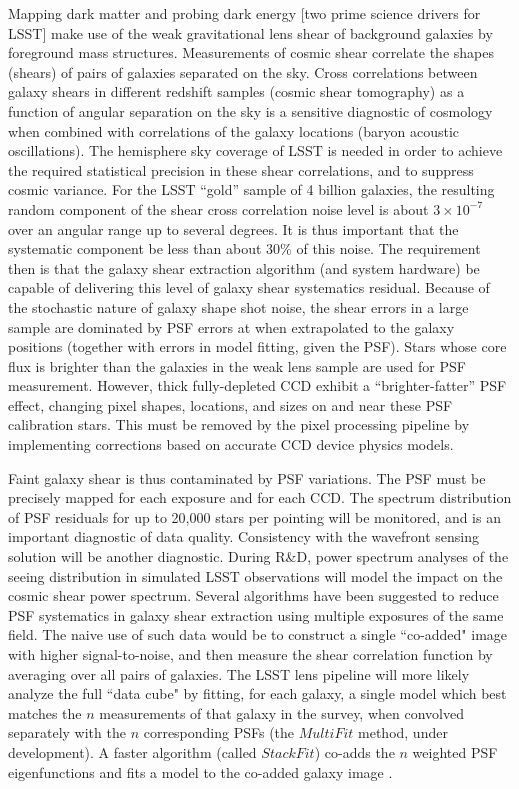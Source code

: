 \documentclass[SE,toc,lsstdraft]{lsstdoc}
\newcommand{\oldtext}[1]{{\color{red} #1}}
\newcommand{\newtext}[1]{{\color{blue} #1}}
\begin{document}
Mapping dark matter and probing dark energy [two prime science drivers for LSST] make use of the weak gravitational lens shear of background galaxies by foreground mass structures. Measurements of cosmic shear correlate the shapes (shears) of pairs of galaxies separated on the sky.  Cross correlations between galaxy shears in different redshift samples (cosmic shear tomography) \newtext{as a function of angular separation on the sky} is a sensitive diagnostic of cosmology when combined with correlations of the galaxy locations (baryon acoustic oscillations). The hemisphere sky coverage of LSST is needed in order to achieve the required statistical precision in these shear correlations, and to suppress cosmic variance.  For the LSST ``gold'' sample of 4 billion galaxies, the resulting random component of the shear cross correlation noise level is about $3\times10^{-7}$ over an angular range up to several degrees.  It is thus important that the systematic component be less than about 30\% of this noise.  The requirement then is that the galaxy shear extraction algorithm (and system hardware) be capable of delivering this level of galaxy shear systematics residual.  Because of the stochastic nature of galaxy shape shot noise, the shear errors in a large sample are dominated by PSF errors \oldtext{at} \newtext{when extrapolated to} the galaxy positions (together with errors in model fitting, given the PSF).
\newtext{
Stars whose core flux is brighter than the galaxies in the weak lens sample are used for PSF measurement.
However, thick fully-depleted CCD exhibit a ``brighter-fatter'' PSF effect, changing pixel shapes, locations, and sizes on and near these PSF calibration stars.
This must be removed by the pixel processing pipeline by implementing corrections based on accurate CCD device physics models.
}

Faint galaxy shear is thus contaminated by PSF variations. The PSF must be precisely mapped for each exposure and for each CCD. The \oldtext{spectrum} \newtext{distribution} of PSF residuals for up to 20,000 stars per pointing will be monitored, and is an important diagnostic of data quality. Consistency with the wavefront sensing solution will be another diagnostic.
\oldtext{During R\&D, power spectrum analyses of the seeing distribution in simulated LSST observations will model the impact on the cosmic shear power spectrum.}
Several algorithms have been suggested to reduce PSF systematics in galaxy shear extraction using multiple exposures of the same field.  The naive use of such data would be to construct a single ``co-added" image with higher signal-to-noise, and then measure the shear correlation function by averaging over all pairs of galaxies.  The LSST lens pipeline will more likely analyze the full ``data cube" by fitting, for each galaxy, a single model which best matches the $n$ measurements of that galaxy in the survey, when convolved separately with the $n$ corresponding PSFs (the $MultiFit$ method, under development). A faster algorithm (called $StackFit$) co-adds the $n$ weighted PSF eigenfunctions and fits a model to the co-added galaxy image \citep{2011PASP..123..596J}.
\end{document}
